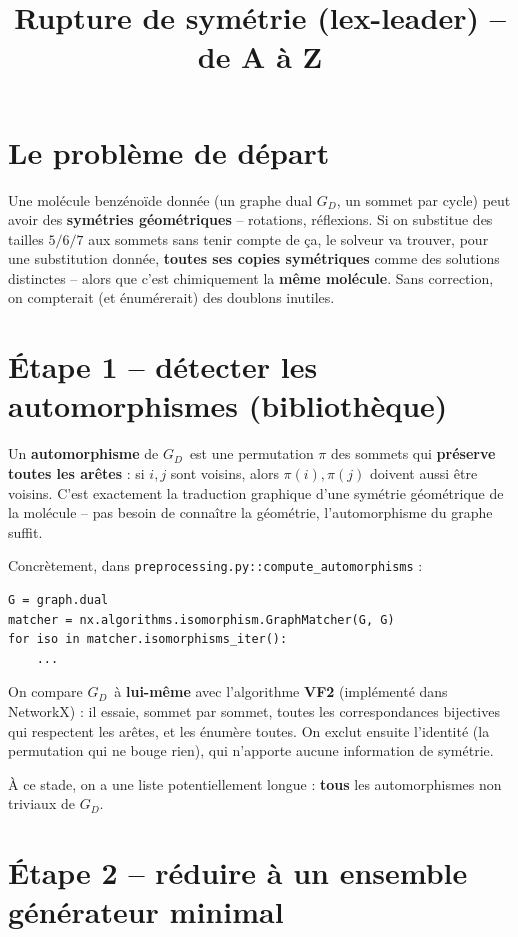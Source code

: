 \documentclass[11pt,a4paper]{article}
\title{\vspace{-1.5em}Rupture de symétrie (lex-leader) -- de A à Z}
\author{}
\date{}
\newcommand{\GD}{\ensuremath{G_D}}
\begin{document}
\maketitle
\vspace{-2em}

\section{Le problème de départ}

Une molécule benzénoïde donnée (un graphe dual \GD, un sommet par cycle)
peut avoir des \textbf{symétries géométriques} -- rotations, réflexions.
Si on substitue des tailles $5/6/7$ aux sommets sans tenir compte de ça,
le solveur va trouver, pour une substitution donnée, \textbf{toutes ses
copies symétriques} comme des solutions distinctes -- alors que c'est
chimiquement la \textbf{même molécule}. Sans correction, on compterait
(et énumérerait) des doublons inutiles.

\section{Étape 1 -- détecter les automorphismes (bibliothèque)}

Un \textbf{automorphisme} de \GD\ est une permutation $\pi$ des sommets
qui \textbf{préserve toutes les arêtes} : si $i,j$ sont voisins, alors
$\pi(i),\pi(j)$ doivent aussi être voisins. C'est exactement la
traduction graphique d'une symétrie géométrique de la molécule -- pas
besoin de connaître la géométrie, l'automorphisme du graphe suffit.

Concrètement, dans \texttt{preprocessing.py::compute\_automorphisms} :

\begin{lstlisting}
G = graph.dual
matcher = nx.algorithms.isomorphism.GraphMatcher(G, G)
for iso in matcher.isomorphisms_iter():
    ...
\end{lstlisting}

On compare \GD\ à \textbf{lui-même} avec l'algorithme \textbf{VF2}
(implémenté dans NetworkX) : il essaie, sommet par sommet, toutes les
correspondances bijectives qui respectent les arêtes, et les énumère
toutes. On exclut ensuite l'identité (la permutation qui ne bouge
rien), qui n'apporte aucune information de symétrie.

À ce stade, on a une liste potentiellement longue : \textbf{tous} les
automorphismes non triviaux de \GD.

\section{Étape 2 -- réduire à un ensemble générateur minimal}
\end{document}
